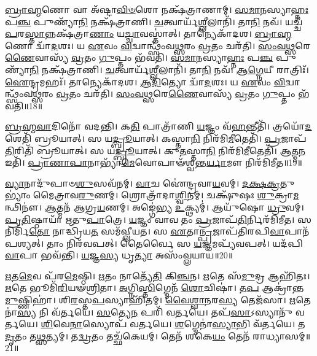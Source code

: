 \-\ul{𑌬𑍍𑌰𑌾}\-\-\ul{𑌹𑍍𑌮}\-𑌣𑍋 𑌵𑌾 𑌅᳴𑌷𑍍𑌟𑌾\-\ul{𑌵𑌿}\-\-\ul{𑍞}\-𑌶𑍋 𑌨𑌕𑍍𑌷᳴𑌤𑍍𑌰𑌾𑌣𑌾𑌮𑍍।
\-\ul{𑌸}\-\-\ul{𑌮𑌾}\-𑌨𑌸𑍍𑌯𑌾\-\ul{𑌹𑍍𑌨𑌃} 𑌪\-\ul{𑌞𑍍𑌚} 𑌪𑍁𑌣𑍍𑌯𑌾᳴\-\ul{𑌨𑌿} 𑌨𑌕𑍍𑌷᳴𑌤𑍍𑌰𑌾𑌣𑌿।
\-\ul{𑌚}\-𑌤𑍍𑌵𑌾𑌰𑍍𑌯᳴\-\ul{𑌶𑍍𑌲𑍀}\-𑌲𑌾𑌨𑌿᳴।
𑌤𑌾\-\ul{𑌨𑌿} 𑌨𑌵᳴।
𑌯𑌚𑍍𑌚᳴ \ul{𑌪}\-𑌰\-\ul{𑌸𑍍𑌤𑌾}\-𑌨𑍍𑌨𑌕𑍍𑌷᳴𑌤𑍍𑌰𑌾\-\ul{𑌣𑌾𑌂} 𑌯\-\ul{𑌚𑍍𑌚𑌾}\-𑌵𑌸𑍍𑌤𑌾॑𑌤𑍍।
𑌤𑌾𑌨𑍍𑌯𑍇𑌕𑌾᳴𑌦𑌶।
\-\ul{𑌬𑍍𑌰𑌾}\-\-\ul{𑌹𑍍𑌮}\-𑌣𑍋 𑌦𑍍𑌵𑌾᳴\-\ul{𑌦}\-𑌶𑌃।
𑌯 \ul{𑌏}\-𑌵𑌂 \ul{𑌵𑌿}\-𑌦𑍍𑌵𑌾𑌨𑍍𑌥𑍍𑌸𑌂᳴𑌵\-\ul{𑌥𑍍𑌸}\-𑌰𑌂 \ul{𑌵𑍍𑌰}\-𑌤𑌂 𑌚𑌰᳴𑌤𑌿।
\-\ul{𑌸𑌂}\-\-\ul{𑌵}\-\-\ul{𑌥𑍍𑌸}\-𑌰𑍇\-\ul{𑌣𑍈}\-𑌵𑌾𑌸𑍍𑌯᳴ \ul{𑌵𑍍𑌰}\-𑌤𑌂 \ul{𑌗𑍁}\-𑌪𑍍𑌤𑌂 𑌭᳴𑌵𑌤𑌿।
\-\ul{𑌸}\-\-\ul{𑌮𑌾}\-𑌨𑌸𑍍𑌯𑌾\-\ul{𑌹𑍍𑌨𑌃} 𑌪\-\ul{𑌞𑍍𑌚} 𑌪𑍁𑌣𑍍𑌯𑌾᳴\-\ul{𑌨𑌿} 𑌨𑌕𑍍𑌷᳴𑌤𑍍𑌰𑌾𑌣𑌿।
\-\ul{𑌚}\-𑌤𑍍𑌵𑌾𑌰𑍍𑌯᳴\-\ul{𑌶𑍍𑌲𑍀}\-𑌲𑌾𑌨𑌿᳴।
𑌤𑌾\-\ul{𑌨𑌿} 𑌨𑌵᳴।
\-\ul{𑌆}\-\-\ul{𑌗𑍍𑌨𑍇}\-𑌯𑍀 𑌰𑌾𑌤𑍍𑌰𑌿𑌃᳴।
\-\ul{𑌐}\-𑌨𑍍𑌦𑍍𑌰𑌮𑌹𑌃᳴।
𑌤𑌾𑌨𑍍𑌯𑍇𑌕𑌾᳴𑌦𑌶।
\-\ul{𑌆}\-\-\ul{𑌦𑌿}\-𑌤𑍍𑌯𑍋 𑌦𑍍𑌵𑌾᳴\-\ul{𑌦}\-𑌶𑌃।
𑌯 \ul{𑌏}\-𑌵𑌂 \ul{𑌵𑌿}\-𑌦𑍍𑌵𑌾𑌨𑍍𑌥𑍍𑌸𑌂᳴𑌵\-\ul{𑌥𑍍𑌸}\-𑌰𑌂 \ul{𑌵𑍍𑌰}\-𑌤𑌂 𑌚𑌰᳴𑌤𑌿।
\-\ul{𑌸𑌂}\-\-\ul{𑌵}\-\-\ul{𑌥𑍍𑌸}\-𑌰𑍇\-\ul{𑌣𑍈}\-𑌵𑌾𑌸𑍍𑌯᳴ \ul{𑌵𑍍𑌰}\-𑌤𑌂 \ul{𑌗𑍁}\-𑌪𑍍𑌤𑌂 𑌭᳴𑌵𑌤𑌿॥18॥\anuvakamend[\-\ul{𑌸}\-\-\ul{𑌙𑍍𑌗}\-𑌵𑌾𑌥𑍍𑌷𑍋᳴\-\ul{𑌡}\-𑌶𑌿\-\ul{𑌨𑌂} 𑌨𑌿𑌰᳴𑌮𑌿𑌮\-\ul{𑌤} 𑌤𑌤𑍍𑌤𑌦𑌾𑌤𑍍𑌤᳴𑌵𑍀𑌰𑍍𑌯𑌂 𑌨𑌿\-\ul{𑌰𑍍𑌮𑌾}\-𑌰𑍍𑌗𑍋 𑌵᳴𑌦𑍇𑌦𑍍𑌭𑌵𑌤𑌿 𑌸\-\ul{𑌮𑌾}\-𑌨𑌸𑍍𑌯𑌾\-\ul{𑌹𑍍𑌨𑌃} 𑌪\-\ul{𑌞𑍍𑌚} 𑌪𑍁𑌣𑍍𑌯𑌾᳴\-\ul{𑌨𑌿} 𑌨𑌕𑍍𑌷᳴𑌤𑍍𑌰𑌾\-\ul{𑌣𑍍𑌯}\-𑌷𑍍𑌟𑍗 𑌚᳴]

\-\ul{𑌬𑍍𑌰}\-\-\ul{𑌹𑍍𑌮}\-\-\ul{𑌵𑌾}\-𑌦𑌿𑌨𑍋᳴ 𑌵𑌦𑌨𑍍𑌤𑌿।
𑌕\-\ul{𑌤𑌿} 𑌪𑌾𑌤𑍍𑌰𑌾᳴𑌣𑌿 \ul{𑌯}\-𑌜𑍍𑌞𑌂 𑌵᳴\-\ul{𑌹}\-𑌨𑍍𑌤𑍀𑌤𑌿᳴।
𑌤𑍍𑌰𑌯𑍋᳴\-\ul{𑌦}\-𑌶𑍇𑌤𑌿᳴ 𑌬𑍍𑌰𑍂𑌯𑌾𑌤𑍍।
𑌸 𑌯\-\ul{𑌦𑍍𑌬𑍍𑌰𑍂}\-𑌯𑌾𑌤𑍍।
𑌕𑌸𑍍𑌤𑌾\-\ul{𑌨𑌿} 𑌨𑌿𑌰᳴𑌮𑌿\-\ul{𑌮𑍀}\-𑌤𑍇𑌤𑌿᳴।
\-\ul{𑌪𑍍𑌰}\-𑌜𑌾𑌪᳴\-\ul{𑌤𑌿}\-𑌰𑌿𑌤𑌿᳴ 𑌬𑍍𑌰𑍂𑌯𑌾𑌤𑍍।
𑌸 𑌯\-\ul{𑌦𑍍𑌬𑍍𑌰𑍂}\-𑌯𑌾𑌤𑍍।
𑌕𑍁\-\ul{𑌤}\-𑌸𑍍𑌤𑌾\-\ul{𑌨𑌿} 𑌨𑌿𑌰᳴𑌮𑌿\-\ul{𑌮𑍀}\-𑌤𑍇𑌤𑌿᳴।
\-\ul{𑌆}\-𑌤𑍍𑌮\-\ul{𑌨} 𑌇𑌤𑌿᳴।
\-\ul{𑌪𑍍𑌰𑌾}\-\-\ul{𑌣𑌾}\-\-\ul{𑌪𑌾}\-𑌨𑌾𑌭𑍍𑌯𑌾᳴\-\ul{𑌮𑍇}\-𑌵𑍋𑌪𑌾𑍟᳴\-𑌶𑍍𑌵𑌨𑍍𑌤\-\ul{𑌰𑍍𑌯𑌾}\-𑌮𑍗 𑌨𑌿𑌰᳴𑌮𑌿𑌮𑍀𑌤॥19॥

\-\ul{𑌵𑍍𑌯𑌾}\-𑌨𑌾𑌦𑍁᳴𑌪𑌾𑍞\-\ul{𑌶𑍁}\-𑌸𑌵᳴𑌨𑌮𑍍।
\-\ul{𑌵𑌾}\-𑌚 𑌐॑𑌨𑍍𑌦𑍍𑌰𑌵𑌾\-\ul{𑌯}\-𑌵𑌮𑍍।
\-\ul{𑌦}\-\-\ul{𑌕𑍍𑌷}\-\-\ul{𑌕𑍍𑌰}\-𑌤𑍁𑌭𑍍𑌯𑌾𑌂॑ 𑌮𑍈𑌤𑍍𑌰𑌾𑌵\-\ul{𑌰𑍁}\-𑌣𑌮𑍍।
𑌶𑍍𑌰𑍋𑌤𑍍𑌰𑌾᳴𑌦𑌾\-\ul{𑌶𑍍𑌵𑌿}\-𑌨𑌮𑍍।
𑌚𑌕𑍍𑌷𑍁᳴𑌷𑌃 \ul{𑌶𑍁}\-𑌕𑍍𑌰𑌾\-\ul{𑌮}\-𑌨𑍍𑌥𑌿𑌨𑍗॑।
\-\ul{𑌆}\-𑌤𑍍𑌮𑌨᳴ 𑌆𑌗𑍍𑌰\-\ul{𑌯}\-𑌣𑌮𑍍।
𑌅𑌙𑍍𑌗𑍇॑𑌭𑍍𑌯 \ul{𑌉}\-𑌕𑍍𑌥𑍍𑌯𑌮𑍍॑।
𑌆𑌯𑍁᳴𑌷𑍋 \ul{𑌧𑍍𑌰𑍁}\-𑌵𑌮𑍍।
\-\ul{𑌪𑍍𑌰}\-\-\ul{𑌤𑌿}\-𑌷𑍍𑌠𑌾𑌯𑌾᳴ 𑌋𑌤𑍁\-\ul{𑌪𑌾}\-𑌤𑍍𑌰𑍇।
\-\ul{𑌯}\-𑌜𑍍𑌞𑌂 𑌵𑌾𑌵 𑌤𑌂 \ul{𑌪𑍍𑌰}\-𑌜𑌾𑌪᳴\-\ul{𑌤𑌿}\-𑌰𑍍𑌨𑌿𑌰᳴𑌮𑌿𑌮𑍀𑌤।
𑌸 𑌨𑌿𑌰𑍍𑌮𑌿᳴\-\ul{𑌤𑍋} 𑌨𑌾𑌦𑍍𑌧𑍍𑌰𑌿᳴𑌯\-\ul{𑌤} 𑌸𑌮᳴𑌵𑍍𑌲𑍀𑌯𑌤।
𑌸 \ul{𑌏}\-𑌤𑌾\-\ul{𑌨𑍍𑌪𑍍𑌰}\-𑌜𑌾𑌪᳴𑌤𑌿𑌰𑌪𑌿\-\ul{𑌵𑌾}\-𑌪𑌾𑌨᳴𑌪𑌶𑍍𑌯𑌤𑍍।
𑌤𑌾𑌂 𑌨𑌿𑌰᳴𑌵𑌪𑌤𑍍।
𑌤𑍈𑌰𑍍𑌵𑍈 𑌸 \ul{𑌯}\-𑌜𑍍𑌞𑌮𑌪𑍍𑌯᳴𑌵𑌪𑌤𑍍।
𑌯𑌦᳴𑌪𑌿\-\ul{𑌵𑌾}\-𑌪𑌾 𑌭𑌵᳴𑌨𑍍𑌤𑌿।
\-\ul{𑌯}\-𑌜𑍍𑌞\-\ul{𑌸𑍍𑌯} 𑌧𑍃\-\ul{𑌤𑍍𑌯𑌾} 𑌅𑌸𑌂᳴𑌵𑍍𑌲𑌯𑌾𑌯॥20॥\anuvakamend[\-\ul{𑌉}\-\-\ul{𑌪𑌾}\-\-\ul{𑍞}\-\-\ul{𑌶𑍍𑌵}\-\-\ul{𑌨𑍍𑌤}\-\-\ul{𑌰𑍍𑌯𑌾}\-𑌮𑍗 𑌨𑌿𑌰᳴𑌮𑌿𑌮𑍀𑌤𑌾𑌮𑌿𑌮𑍀\-\ul{𑌤} 𑌷𑌟𑍍𑌚᳴]

\-\ul{𑌋}\-𑌤\-\ul{𑌮𑍇}\-𑌵 𑌪᳴𑌰\-\ul{𑌮𑍇}\-𑌷𑍍𑌠𑌿।
\-\ul{𑌋}\-𑌤𑌂 𑌨𑌾𑌤𑍍𑌯𑍇᳴\-\ul{𑌤𑌿} 𑌕𑌿\-\ul{𑌞𑍍𑌚}\-𑌨।
\-\ul{𑌋}\-𑌤𑍇 𑌸᳴\-\ul{𑌮𑍁}\-𑌦𑍍𑌰 𑌆𑌹𑌿᳴𑌤𑌃।
\-\ul{𑌋}\-𑌤𑍇 𑌭𑍂𑌮𑌿᳴\-\ul{𑌰𑌿}\-𑌯𑍟\-\ul{𑌶𑍍𑌰𑌿}\-𑌤𑌾।
\-\ul{𑌅}\-𑌗𑍍𑌨𑌿\-\ul{𑌸𑍍𑌤𑌿}\-𑌗𑍍𑌮𑍇𑌨᳴ \ul{𑌶𑍋}\-𑌚𑌿𑌷𑌾॑।
𑌤\-\ul{𑌪} 𑌆𑌕𑍍𑌰𑌾॑𑌨𑍍𑌤\-\ul{𑌮𑍁}\-𑌷𑍍𑌣𑌿𑌹𑌾॑।
𑌶𑌿\-\ul{𑌰}\-𑌸𑍍𑌤\-\ul{𑌪}\-𑌸𑍍𑌯𑌾𑌹𑌿᳴𑌤𑌮𑍍।
\-\ul{𑌵𑍈}\-\-\ul{𑌶𑍍𑌵𑌾}\-\-\ul{𑌨}\-𑌰\-\ul{𑌸𑍍𑌯} 𑌤𑍇𑌜᳴𑌸𑌾।
\-\ul{𑌋}\-𑌤𑍇𑌨𑌾॑\-\ul{𑌸𑍍𑌯} 𑌨𑌿 𑌵᳴𑌰𑍍𑌤𑌯𑍇।
\-\ul{𑌸}\-𑌤𑍍𑌯𑍇\-\ul{𑌨} 𑌪𑌰𑌿᳴ 𑌵𑌰𑍍𑌤𑌯𑍇।
𑌤𑌪᳴\-\ul{𑌸𑌾}\-\-𑌽𑌸𑍍𑌯𑌾𑌨𑍁᳴ 𑌵𑌰𑍍𑌤𑌯𑍇।
\-\ul{𑌶𑌿}\-𑌵𑍇\-\ul{𑌨𑌾}\-𑌸𑍍𑌯𑍋𑌪᳴ 𑌵𑌰𑍍𑌤𑌯𑍇।
\-\ul{𑌶}\-𑌗𑍍𑌮𑍇𑌨𑌾॑\-\ul{𑌸𑍍𑌯𑌾}\-𑌭𑌿 𑌵᳴𑌰𑍍𑌤𑌯𑍇।
𑌤\-\ul{𑌦𑍃}\-𑌤𑌂 𑌤\-\ul{𑌥𑍍𑌸}\-𑌤𑍍𑌯𑌮𑍍।
𑌤\-\ul{𑌦𑍍𑌵𑍍𑌰}\-𑌤𑌂 𑌤𑌚𑍍𑌛᳴𑌕𑍇𑌯𑌮𑍍।
𑌤𑍇𑌨᳴ 𑌶𑌕𑍇\-\ul{𑌯𑌂} 𑌤𑍇𑌨᳴ 𑌰𑌾𑌧𑍍𑌯𑌾𑌸𑌮𑍍॥21॥

